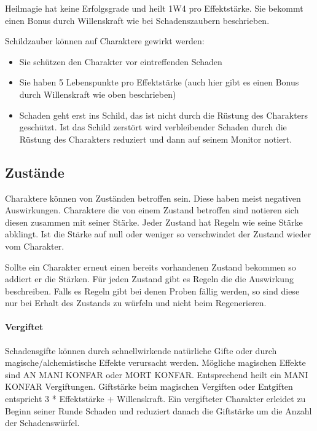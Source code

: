 \documentclass{article}
\begin{document}
Heilmagie hat keine Erfolgsgrade und heilt 1W4 pro Effektstärke. Sie bekommt einen Bonus durch Willenskraft wie
bei Schadenszaubern beschrieben.

Schildzauber können auf Charaktere gewirkt werden:

\begin{itemize}
\item Sie schützen den Charakter vor eintreffenden Schaden
\item Sie haben 5 Lebenspunkte pro Effektstärke (auch hier gibt es einen Bonus durch Willenskraft wie oben beschrieben)
\item Schaden geht erst ins Schild, das ist nicht durch die Rüstung des Charakters geschützt. Ist das Schild zerstört wird verbleibender Schaden durch die Rüstung des Charakters reduziert und dann auf seinem Monitor notiert.
\end{itemize}

\begin{center}
\subsection{Zustände}
\end{center}

Charaktere können von Zuständen betroffen sein. Diese haben meist negativen Auswirkungen. Charaktere die von einem
Zustand betroffen sind notieren sich diesen zusammen mit seiner Stärke. Jeder Zustand hat Regeln wie seine Stärke
abklingt. Ist die Stärke auf null oder weniger so verschwindet der Zustand wieder vom Charakter.

Sollte ein Charakter erneut einen bereits vorhandenen Zustand bekommen so addiert er die Stärken. Für jeden Zustand
gibt es Regeln die die Auswirkung beschreiben. Falls es Regeln gibt bei denen Proben fällig werden, so sind diese nur
bei Erhalt des Zustands zu würfeln und nicht beim Regenerieren.

\paragraph{Vergiftet}

Schadensgifte können durch schnellwirkende natürliche Gifte oder durch magische/alchemistische Effekte verursacht
werden. Mögliche magischen Effekte sind AN MANI KONFAR oder MORT KONFAR. Entsprechend heilt ein MANI KONFAR
Vergiftungen. Giftstärke beim magischen Vergiften oder Entgiften entspricht 3 * Effektstärke + Willenskraft. Ein
vergifteter Charakter erleidet zu Beginn seiner Runde Schaden und reduziert danach die Giftstärke um die Anzahl der
Schadenswürfel.
\end{document}
